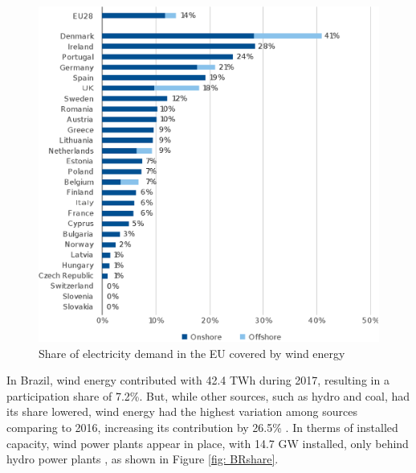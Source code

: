 \begin{figure}[]
	\caption{Share of electricity demand in the EU covered by wind energy}
	\begin{center}
		\includegraphics[scale=0.5]{Images/EUrank.eps}
	\end{center}
	\label{fig: EUrank}
\end{figure}

In Brazil, wind energy contributed with 42.4 TWh during 2017, resulting in a participation share of 7.2\%. But, while other sources, such as hydro and coal, had its share lowered, wind energy had the highest variation among sources comparing to 2016, increasing its contribution by 26.5\% \cite{EPE2018}. In therms of installed capacity, wind power plants appear in  place, with 14.7 GW installed, only behind hydro power plants \cite{ABEEolica2018}, as shown in Figure \ref{fig: BRshare}.

